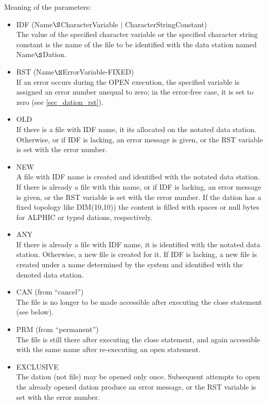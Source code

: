 Meaning of the parameters:
\begin{itemize}
\item IDF (Name$\S $CharacterVariable $\mid$ CharacterStringConstant)\\
The value of the specified character variable or the specified character
string constant is the name of the file to be identified with the data
station named Name$\S $Dation.
\item RST (Name$\S $ErrorVariable-FIXED)\\
If an error occurs during the OPEN execution, the specified variable is
assigned an error number unequal to zero; in the error-free case, it is
set to zero (see \ref{sec_dation_rst}).
\item OLD\\
If there is a file with IDF name, it its allocated on the notated data
station. Otherwise, or if IDF is lacking, an error message is given, or
the RST variable is set with the error number.
\item NEW\\
A file with IDF name is created and identified with the notated data
station. If there is already a file with this name, or if IDF is
lacking, an error message is given, or the RST variable is set with the
error number.
If the dation has a fixed topology like DIM(10,10)) the content is
filled with spaces or null bytes for ALPHIC or typed dations, respectively.
\item ANY\\
If there is already a file with IDF name, it is identified with the
notated data station. Otherwise, a new file is created for it. If IDF
is lacking, a new file is created under a name determined by the system
and identified with the denoted data station.
\item CAN (from ``cancel'')\\
The file is no longer to be made accessible after executing the close
statement (see below).
\item PRM (from ``permanent'')\\
The file is still there after executing the close statement, and again
accessible with the same name after re-executing an open statement.
\item EXCLUSIVE \\
The dation (not file) may be opened only once.
Subsequent attempts to open the already
opened  dation produce an error message, or the RST variable is set with the
error number.
\end{itemize}

